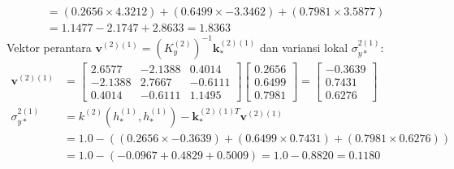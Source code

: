 \documentclass[11pt,a4paper]{article}
\begin{document}
\begin{enumerate}
\begin{align}
    &= (0.2656 \times 4.3212) + (0.6499 \times -3.3462) + (0.7981 \times 3.5877) \nonumber \\
    &= 1.1477 - 2.1747 + 2.8633 = \mathbf{1.8363}
    \end{align}
    Vektor perantara $\mathbf{v}^{(2)(1)} = (K_y^{(2)})^{-1} \mathbf{k}_*^{(2)(1)}$ dan variansi lokal $\sigma_{y*}^{2(1)}$:
    \begin{align}
    \mathbf{v}^{(2)(1)} &= \begin{bmatrix} 2.6577 & -2.1388 & 0.4014 \\ -2.1388 & 2.7667 & -0.6111 \\ 0.4014 & -0.6111 & 1.1495 \end{bmatrix} \begin{bmatrix} 0.2656 \\ 0.6499 \\ 0.7981 \end{bmatrix} = \begin{bmatrix} -0.3639 \\ 0.7431 \\ 0.6276 \end{bmatrix} \\
    \sigma_{y*}^{2(1)} &= k^{(2)}(h_*^{(1)}, h_*^{(1)}) - \mathbf{k}_*^{(2)(1)T} \mathbf{v}^{(2)(1)} \nonumber \\
    &= 1.0 - \left( (0.2656 \times -0.3639) + (0.6499 \times 0.7431) + (0.7981 \times 0.6276) \right) \nonumber \\
    &= 1.0 - (-0.0967 + 0.4829 + 0.5009) = 1.0 - 0.8820 = \mathbf{0.1180}
    \end{align}
    

\end{enumerate}
\end{document}
